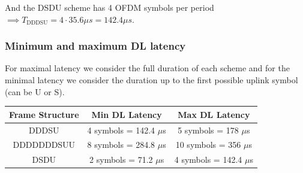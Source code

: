 \documentclass[]{article}
\begin{document}
	And the DSDU scheme has 4 OFDM symbols per period $\implies T_{\text{DDDSU}} = 4 \cdot 35.6 \mu s = 142.4 \mu s$.
	
	\subsubsection*{Minimum and maximum DL latency}
	
	For maximal latency we consider the full duration of each scheme and for the minimal latency we consider the duration up to the first possible uplink symbol (can be U or S).
	
	\begin{table}[h]
		\centering
		\begin{tabular}{|c|c|c|}
			\hline
			\textbf{Frame Structure} & \textbf{Min DL Latency} & \textbf{Max DL Latency} \\
			\hline
			DDDSU & 4 symbols = 142.4 $\mu$s & 5 symbols = 178 $\mu$s \\
			\hline
			DDDDDDDSUU & 8 symbols = 284.8 $\mu$s & 10 symbols = 356 $\mu$s \\
			\hline
			DSDU & 2 symbols = 71.2 $\mu$s & 4 symbols = 142.4 $\mu$s \\
			\hline
		\end{tabular}
	\end{table}
	
\end{document}

